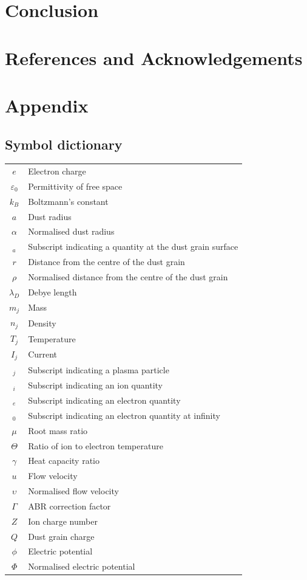 \documentclass{article}
\begin{document}
\section{Conclusion}


\section{References and Acknowledgements}



\section{Appendix}

\subsection{Symbol dictionary}
\begin{center}
\begin{tabular}{cl} 

$e$ & Electron charge \\
$\varepsilon_0$ & Permittivity of free space \\
$k_B$ & Boltzmann's constant \\
$a$ & Dust radius\\
$\alpha$ & Normalised dust radius \\
$_a$ & Subscript indicating a quantity at the dust grain surface \\
$r$ & Distance from the centre of the dust grain \\
$\rho$ & Normalised distance from the centre of the dust grain \\
$\lambda_D$ & Debye length \\
$m_j$ & Mass \\
$n_j$ & Density \\
$T_j$ & Temperature \\
$I_j$ & Current \\
$_j$ & Subscript indicating a plasma particle \\
$_i$ & Subscript indicating an ion quantity \\
$_e$ & Subscript indicating an electron quantity \\
$_0$ & Subscript indicating an electron quantity at infinity \\
$\mu$ & Root mass ratio\\
$\Theta$ & Ratio of ion to electron temperature \\
$\gamma$ & Heat capacity ratio \\
$u$ & Flow velocity \\
$\upsilon$ & Normalised flow velocity \\
$\Gamma$ & ABR correction factor \\
$Z$ & Ion charge number \\
$Q$ & Dust grain charge \\
$\phi$ & Electric potential \\
$\Phi$ & Normalised electric potential \\

\end{tabular}
\end{center}
\end{document}
